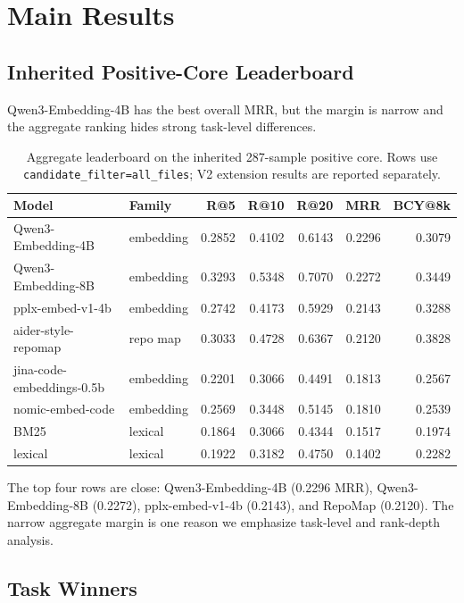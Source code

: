 \documentclass[11pt]{article}
\newcommand{\code}[1]{\texttt{#1}}
\begin{document}
\section{Main Results}

\subsection{Inherited Positive-Core Leaderboard}

Qwen3-Embedding-4B has the best overall MRR, but the margin is narrow and the aggregate ranking hides strong task-level differences.

\begin{table}[t]
\centering
\caption{Aggregate leaderboard on the inherited 287-sample positive core. Rows use \code{candidate\_filter=all\_files}; V2 extension results are reported separately.}
\label{tab:overall-leaderboard}
\begin{tabular}{llrrrrr}
\toprule
Model & Family & R@5 & R@10 & R@20 & MRR & BCY@8k \\
\midrule
Qwen3-Embedding-4B & embedding & 0.2852 & 0.4102 & 0.6143 & 0.2296 & 0.3079 \\
Qwen3-Embedding-8B & embedding & 0.3293 & 0.5348 & 0.7070 & 0.2272 & 0.3449 \\
pplx-embed-v1-4b & embedding & 0.2742 & 0.4173 & 0.5929 & 0.2143 & 0.3288 \\
aider-style-repomap & repo map & 0.3033 & 0.4728 & 0.6367 & 0.2120 & 0.3828 \\
jina-code-embeddings-0.5b & embedding & 0.2201 & 0.3066 & 0.4491 & 0.1813 & 0.2567 \\
nomic-embed-code & embedding & 0.2569 & 0.3448 & 0.5145 & 0.1810 & 0.2539 \\
BM25 & lexical & 0.1864 & 0.3066 & 0.4344 & 0.1517 & 0.1974 \\
lexical & lexical & 0.1922 & 0.3182 & 0.4750 & 0.1402 & 0.2282 \\
\bottomrule
\end{tabular}
\end{table}

The top four rows are close: Qwen3-Embedding-4B (0.2296 MRR), Qwen3-Embedding-8B (0.2272), pplx-embed-v1-4b (0.2143), and RepoMap (0.2120). The narrow aggregate margin is one reason we emphasize task-level and rank-depth analysis.

\subsection{Task Winners}
\end{document}

